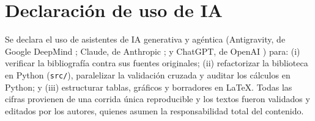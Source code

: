 \section{Declaración de uso de IA}
Se declara el uso de asistentes de IA generativa y agéntica (Antigravity, de Google DeepMind \cite{google2026antigravity}; Claude, de Anthropic \cite{anthropic2026claude}; y ChatGPT, de OpenAI \cite{openai2026chatgpt}) para: (i) verificar la bibliografía contra sus fuentes originales; (ii) refactorizar la biblioteca en Python (\texttt{src/}), paralelizar la validación cruzada y auditar los cálculos en Python; y (iii) estructurar tablas, gráficos y borradores en \LaTeX. Todas las cifras provienen de una corrida única reproducible y los textos fueron validados y editados por los autores, quienes asumen la responsabilidad total del contenido.
